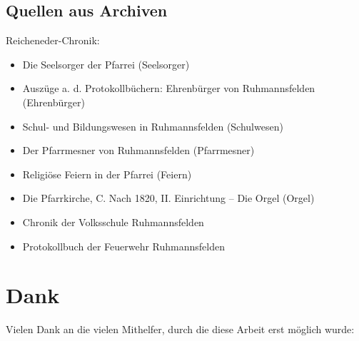 \documentclass{book}
\begin{document}
\subsection{Quellen aus Archiven}

\noindent Reicheneder-Chronik:

\begin{itemize}

\item Die Seelsorger der Pfarrei (Seelsorger)
\item Auszüge a. d. Protokollbüchern: Ehrenbürger von Ruhmannsfelden
(Ehrenbürger)
\item Schul- und Bildungswesen in Ruhmannsfelden (Schulwesen)
\item Der Pfarrmesner von Ruhmannsfelden (Pfarrmesner)
\item Religiöse Feiern in der Pfarrei (Feiern)
\item Die Pfarrkirche, C. Nach 1820, II. Einrichtung – Die Orgel (Orgel)
\item Chronik der Volksschule Ruhmannsfelden
\item Protokollbuch der Feuerwehr Ruhmannsfelden

\end{itemize}

\section{Dank}

Vielen Dank an die vielen Mithelfer, durch die diese Arbeit erst möglich
wurde:
\end{document}
